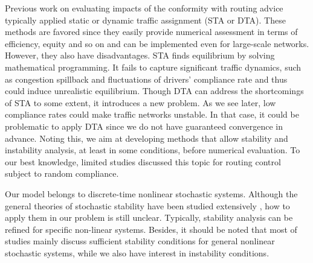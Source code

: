 Previous work on evaluating impacts of the conformity with routing advice typically applied static or dynamic traffic assignment (STA or DTA). These methods are favored since they easily provide numerical assessment in terms of efficiency, equity and so on \cite{van2019travelers, zhang2019modeling,ning2023robust} and can be implemented even for large-scale networks.  However, they also have disadvantages. STA finds equilibrium by solving mathematical programming. It fails to capture significant traffic dynamics, such as congestion spillback and fluctuations of drivers' compliance rate and thus could induce unrealistic equilibrium. Though DTA can address the shortcomings of STA to some extent, it introduces a new problem. As we see later, low compliance rates could make traffic networks unstable. In that case, it could be problematic to apply DTA since we do not have guaranteed convergence in advance. Noting this, we aim at developing methods that allow stability and instability analysis, at least in some conditions, before numerical evaluation. To our best knowledge, limited studies discussed this topic for routing control subject to random compliance.




Our model belongs to discrete-time nonlinear stochastic systems. Although the general theories of stochastic stability have been studied extensively \cite{berman2006h,zhang2016lasalle, zhang2021robust,meyn1993survey,meyn2012markov}, how to apply them in our problem is still unclear. Typically, stability analysis can be refined for specific non-linear systems. Besides, it should be noted that most of studies mainly discuss sufficient stability conditions for general nonlinear stochastic systems, while we also have interest in instability conditions.


